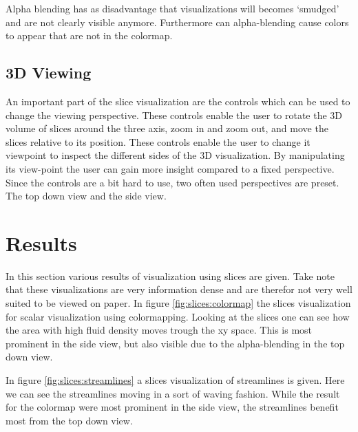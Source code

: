 Alpha blending has as disadvantage that visualizations will becomes `smudged' and are not clearly visible anymore. Furthermore can alpha-blending cause colors to appear that are not in the colormap.

\subsection{3D Viewing} %
\label{sub:3d_controls}
An important part of the slice visualization are the controls which can be used to change the viewing perspective. These controls enable the user to rotate the 3D volume of slices around the three axis, zoom in and zoom out, and move the slices relative to its position. These controls enable the user to change it viewpoint to inspect the different sides of the 3D visualization. By manipulating its view-point the user can gain more insight compared to a fixed perspective. Since the controls are a bit hard to use, two often used perspectives are preset. The top down view and the side view. 

\section{Results} %
\label{sec:results}
In this section various results of visualization using slices are given. Take note that these visualizations are very information dense and are therefor not very well suited to be viewed on paper. In figure \ref{fig:slices:colormap} the slices visualization for scalar visualization using colormapping. Looking at the slices one can see how the area with high fluid density moves trough the xy space. This is most prominent in the side view, but also visible due to the alpha-blending in the top down view.

In figure \ref{fig:slices:streamlines} a slices visualization of streamlines is given. Here we can see the streamlines moving in a sort of waving fashion. While the result for the colormap were most prominent in the side view, the streamlines benefit most from the top down view.


